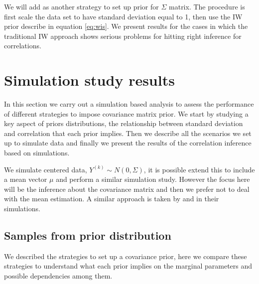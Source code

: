 \documentclass[a4paper]{article}
\begin{document}
We will add as another strategy to set up prior for $\Sigma$ matrix. The procedure is first scale the data set to have standard deviation equal to 1, then use the IW prior describe in equation \ref{eq:wis}. We present results for the cases in which the traditional IW approach shows serious problems for hitting right inference for correlations. 

\section{Simulation study results \label{sec:results}}

In this section we carry out a simulation based analysis to assess the performance of different strategies to impose covariance matrix prior. We start by studying a key aspect of priors distributions, the relationship between standard deviation and correlation that each prior implies. Then we describe all the scenarios we set up to simulate data and finally we present the results of the correlation inference based on simulations.  

We simulate centered data, $Y^{(k)}\sim N(0,\Sigma)$, it is possible extend this to include a mean vector $\mu$ and perform a similar simulation study. However the focus here will be the inference about the covariance matrix and then we prefer not to deal with the mean estimation. A similar approach is taken by  \cite{daniels1999} and \cite{matilde} in their simulations.

\subsection{Samples from  prior distribution} 
We described the strategies to set up a covariance prior, here we compare these strategies to understand what each prior implies on the marginal parameters and possible dependencies among them. 
\end{document}
